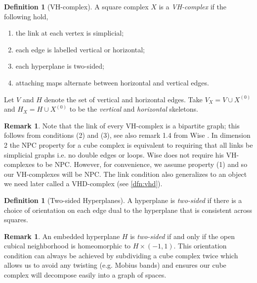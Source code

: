 \documentclass[12pt,parskip=full]{report}
\theoremstyle{plain}
\theoremstyle{definition}
\newtheorem{rmk}[thm]{Remark}
\newtheorem{dfn}[thm]{Definition}
\begin{document}
\begin{dfn}
    [VH-complex]
    A square complex $X$ is a \emph{VH-complex} if the following hold,
    \begin{enumerate}
        \item the link at each vertex is simplicial;
        \item each edge is labelled vertical or horizontal;
        \item each hyperplane is two-sided;
        \item attaching maps alternate between horizontal and vertical edges.
    \end{enumerate}
    Let $V$ and $H$ denote the set of vertical and horizontal edges. Take $V_X = V \cup X^{(0)}$ and $H_X = H \cup X^{(0)}$ to be the \emph{vertical} and \emph{horizontal} skeletons. 
\end{dfn}

\begin{rmk}
Note that the link of every VH-complex is a bipartite graph; this follows from conditions (2) and (3), see also remark 1.4 from Wise \cite{wisethesis}. In dimension 2 the NPC property for a cube complex is equivalent to requiring that all links be simplicial graphs i.e. no double edges or loops. Wise does not require his VH-complexes to be NPC. However, for convenience, we assume property (1) and so our VH-complexes will be NPC. The link condition also generalizes to an object we need later called a VHD-complex (see \ref{dfn:vhd}).
\end{rmk}

\begin{dfn}
    [Two-sided Hyperplanes]
    A hyperplane is \emph{two-sided} if there is a choice of orientation on each edge dual to the hyperplane that is consistent across squares.
\end{dfn}

\begin{rmk}
    An embedded hyperplane \(H\) is \emph{two-sided} if and only if the open cubical neighborhood is homeomorphic to \(H\times (-1,1)\). This orientation condition can always be achieved by subdividing a cube complex twice which allows us to avoid any twisting (e.g. Mobius bands) and ensures our cube complex will decompose easily into a graph of spaces.
\end{rmk}
\end{document}
